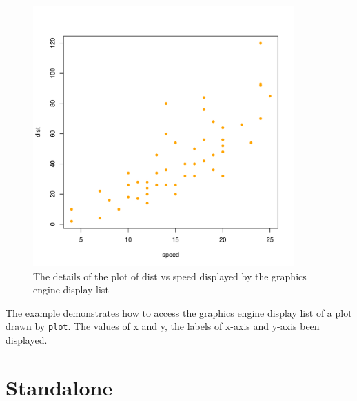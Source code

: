 \documentclass[paper=a4, fontsize=11pt]{report}
\begin{document}
\begin{figure}[h]
\begin{center}
  \includegraphics[height = 10cm, width = 10cm]{figure/report_3.pdf}
  \caption{The details of the plot of dist vs speed displayed by the graphics engine display list}
  	\label{figure_2.1}
\end{center}
\end{figure}

The example demonstrates how to access the graphics engine display list of a plot drawn by \texttt{plot}. The values of x and y, the labels of x-axis and y-axis been displayed.



\chapter{Standalone}
\end{document}
